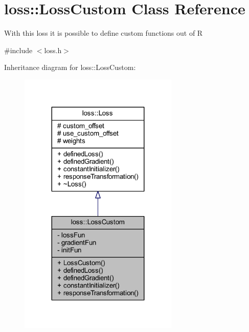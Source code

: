\hypertarget{classloss_1_1_loss_custom}{}\section{loss\+:\+:Loss\+Custom Class Reference}
\label{classloss_1_1_loss_custom}


With this loss it is possible to define custom functions out of {\ttfamily R}  




{\ttfamily \#include $<$loss.\+h$>$}



Inheritance diagram for loss\+:\+:Loss\+Custom\+:
\nopagebreak
\begin{figure}[H]
\begin{center}
\leavevmode
\includegraphics[width=215pt]{classloss_1_1_loss_custom__inherit__graph}
\end{center}
\end{figure}


